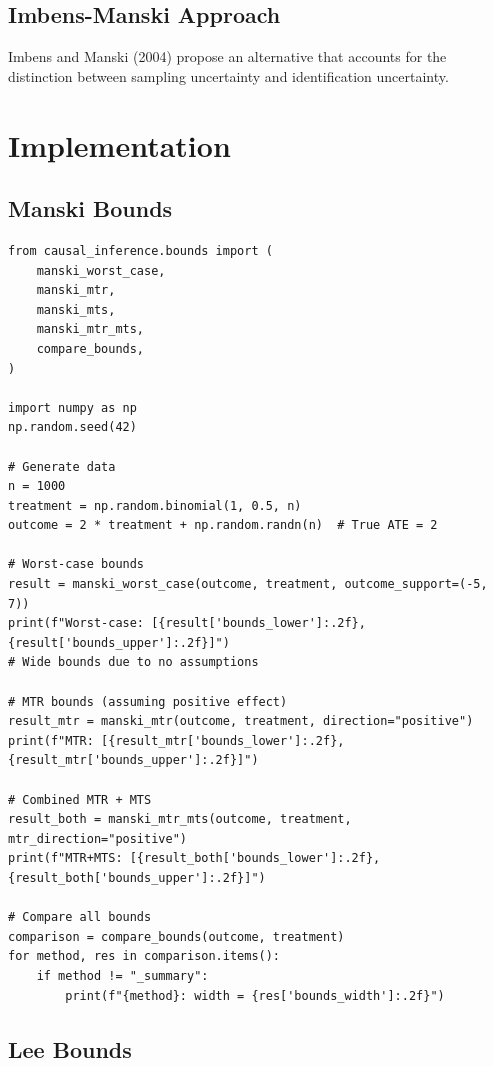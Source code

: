 \subsection{Imbens-Manski Approach}

Imbens and Manski (2004) propose an alternative that accounts for the distinction between sampling uncertainty and identification uncertainty.


\section{Implementation}
\label{sec:bounds_implementation}

\subsection{Manski Bounds}

\begin{verbatim}
from causal_inference.bounds import (
    manski_worst_case,
    manski_mtr,
    manski_mts,
    manski_mtr_mts,
    compare_bounds,
)

import numpy as np
np.random.seed(42)

# Generate data
n = 1000
treatment = np.random.binomial(1, 0.5, n)
outcome = 2 * treatment + np.random.randn(n)  # True ATE = 2

# Worst-case bounds
result = manski_worst_case(outcome, treatment, outcome_support=(-5, 7))
print(f"Worst-case: [{result['bounds_lower']:.2f}, {result['bounds_upper']:.2f}]")
# Wide bounds due to no assumptions

# MTR bounds (assuming positive effect)
result_mtr = manski_mtr(outcome, treatment, direction="positive")
print(f"MTR: [{result_mtr['bounds_lower']:.2f}, {result_mtr['bounds_upper']:.2f}]")

# Combined MTR + MTS
result_both = manski_mtr_mts(outcome, treatment, mtr_direction="positive")
print(f"MTR+MTS: [{result_both['bounds_lower']:.2f}, {result_both['bounds_upper']:.2f}]")

# Compare all bounds
comparison = compare_bounds(outcome, treatment)
for method, res in comparison.items():
    if method != "_summary":
        print(f"{method}: width = {res['bounds_width']:.2f}")
\end{verbatim}

\subsection{Lee Bounds}

